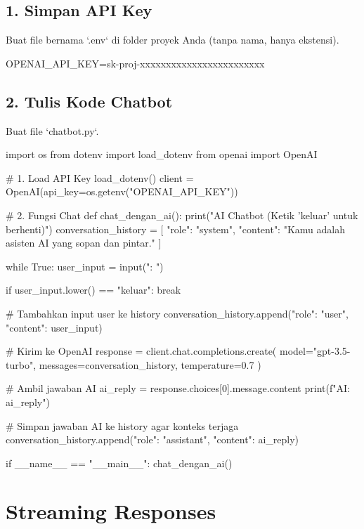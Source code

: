 \subsection{1. Simpan API Key}
Buat file bernama `.env` di folder proyek Anda (tanpa nama, hanya ekstensi).

\begin{codeblock}
OPENAI_API_KEY=sk-proj-xxxxxxxxxxxxxxxxxxxxxxxx
\end{codeblock}

\subsection{2. Tulis Kode Chatbot}

Buat file `chatbot.py`.

\begin{codeblock}[language=Python]
import os
from dotenv import load_dotenv
from openai import OpenAI

# 1. Load API Key
load_dotenv()
client = OpenAI(api_key=os.getenv("OPENAI_API_KEY"))

# 2. Fungsi Chat
def chat_dengan_ai():
    print("AI Chatbot (Ketik 'keluar' untuk berhenti)")
    conversation_history = [
        {"role": "system", "content": "Kamu adalah asisten AI yang sopan dan pintar."}
    ]

    while True:
        user_input = input("\nAnda: ")

        if user_input.lower() == "keluar":
            break

        # Tambahkan input user ke history
        conversation_history.append({"role": "user", "content": user_input})

        # Kirim ke OpenAI
        response = client.chat.completions.create(
            model="gpt-3.5-turbo",
            messages=conversation_history,
            temperature=0.7
        )

        # Ambil jawaban AI
        ai_reply = response.choices[0].message.content
        print(f"AI: {ai_reply}")

        # Simpan jawaban AI ke history agar konteks terjaga
        conversation_history.append({"role": "assistant", "content": ai_reply})

if __name__ == "__main__":
    chat_dengan_ai()
\end{codeblock}

\section{Streaming Responses}

